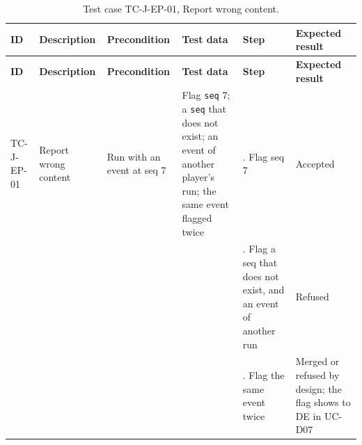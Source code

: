 {\footnotesize{}\renewcommand{\arraystretch}{1.1}
\begin{longtable}{|>{\raggedright\arraybackslash}p{}|>{\raggedright\arraybackslash}p{}|>{\raggedright\arraybackslash}p{}|>{\raggedright\arraybackslash}p{}|>{\raggedright\arraybackslash}p{}|>{\raggedright\arraybackslash}p{}|}
\caption{Test case TC-J-EP-01, Report wrong content.} \\
\hline
\textbf{ID} & \textbf{Description} & \textbf{Precondition} & \textbf{Test data} & \textbf{Step} & \textbf{Expected result} \\ \hline
\endfirsthead
\hline
\textbf{ID} & \textbf{Description} & \textbf{Precondition} & \textbf{Test data} & \textbf{Step} & \textbf{Expected result} \\ \hline
\endhead
TC-J-EP-01 & Report wrong content & Run with an event at seq 7 & Flag \texttt{seq} 7; a \texttt{seq} that does not exist; an event of another player's run; the same event flagged twice & 1. Flag seq 7 & Accepted \\ \cline{5-6}
 &  &  &  & 2. Flag a seq that does not exist, and an event of another run & Refused \\ \cline{5-6}
 &  &  &  & 3. Flag the same event twice & Merged or refused by design; the flag shows to DE in UC-D07 \\ \hline
\end{longtable}
}

